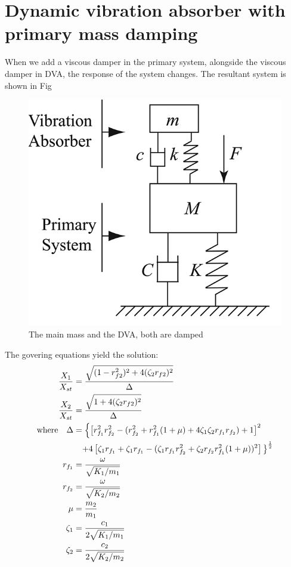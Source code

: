 \section{Dynamic vibration absorber with primary mass damping}
When we add a viscous damper in the primary system, alongside the viscous damper in DVA,  the response of the system changes. The resultant system is shown in Fig
\begin{figure}[h]
\centering
\includegraphics[scale=0.5]{"figures/withPrimaryMassDamping"}
\caption{The main mass and the DVA, both are damped}
\label{damped}
\end{figure}


The govering equations yield the solution: \\
\begin{align}
\dfrac{X_1}{X_{st}} &= \dfrac{\sqrt{(1-r_{f2}^2)^2 + 4(\zeta_2 r_{f2})^2}}{\Delta} \\
\dfrac{X_2}{X_{st}} &= \dfrac{\sqrt{\strut 1 + 4(\zeta_2 r_{f2})^2}}{\Delta} \\
\text{where}\quad \Delta &= 
\left\lbrace
\left[
r_{f_1}^2 r_{f_2}^2 - 
( r_{f_2}^2 + r_{f_1}^2 
(1 + \mu)
+ 4 \zeta_1 \zeta_2 r_{f_1} r_{f_2} 
) 
 + 1
\right] ^2 \right.\\
&\phantom{=} \left. + 4 
\left[
 \zeta_1 r_{f_1} + \zeta_1 r_{f_1} -
 (
 \zeta_1 r_{f_1} r_{f_2}^2 + \zeta_2 r_{f_2} r_{f_1}^2 
 (1+\mu)
)^2
\right]
\strut \right\rbrace^\frac{1}{2} \\
r_{f_1} &= \frac{\omega}{\sqrt{K_1 / m_1}}\\
r_{f_2} &= \frac{\omega}{\sqrt{K_2 / m_2}}\\
\mu &= \frac{m_2}{m_1} \\
\zeta_1 &= \frac{c_1}{2\sqrt{K_1/m_1}} \\
\zeta_2 &= \frac{c_2}{2\sqrt{K_2/m_2}}
\end{align}

